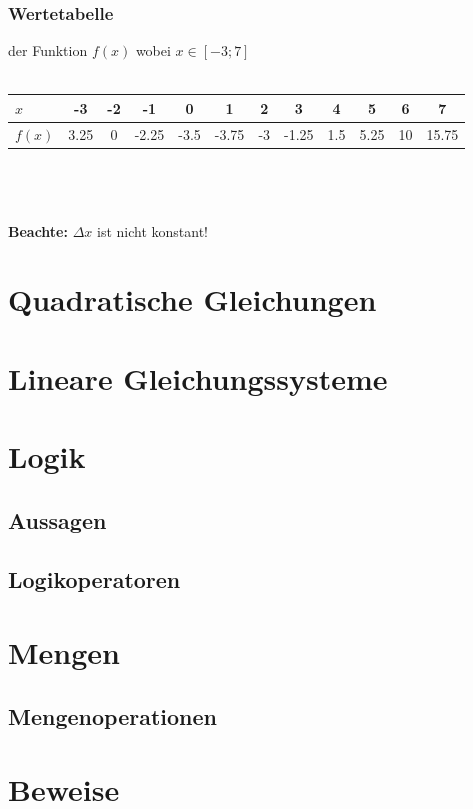 \documentclass[12pt,a4paper]{scrbook}
\begin{document}
\subsection{Wertetabelle} der Funktion $f(x)$ wobei $x \in [-3; 7]$\\\\
\begin{tabular}{l||c|c|c|c|c|c|c|c|c|c|c}
$x$ & -3 & -2 & -1 & 0 & 1 & 2 & 3 & 4 & 5 & 6 & 7\\
\hline
$f(x)$ & 3.25 & 0 & -2.25 & -3.5 & -3.75 & -3 & -1.25 & 1.5 & 5.25 & 10 & 15.75\\
\end{tabular}\\\\\\
\textbf{Beachte:} $\Delta x$ ist nicht konstant!\\


\chapter{Quadratische Gleichungen}
\label{quadratische_gleichungen}


\chapter{Lineare Gleichungssysteme}


\chapter{Logik}
\section{Aussagen}
\section{Logikoperatoren}

\chapter{Mengen}
\section{Mengenoperationen}

\chapter{Beweise}
\end{document}
